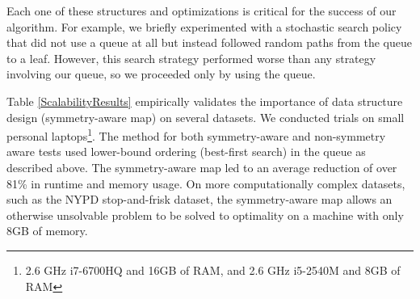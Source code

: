 \documentclass[format=sigconf]{acmart}
\begin{document}

Each one of these structures and optimizations is critical for the success of our algorithm.
For example, we briefly experimented with a stochastic search policy that did not use a queue at all but instead followed random paths from the queue to a leaf.
However, this search strategy performed worse than any strategy involving our queue, so we proceeded only by using the queue.

Table \ref{ScalabilityResults} empirically validates the importance of data structure design (symmetry-aware map) on several datasets.
We conducted trials on small personal laptops\footnote{2.6 GHz i7-6700HQ and 16GB of RAM, and 2.6 GHz i5-2540M and 8GB of RAM}.
The method for both symmetry-aware and non-symmetry aware tests used lower-bound ordering (best-first search) in the queue as described above.
The symmetry-aware map led to an average reduction of over 81\% in runtime and memory usage. 
On more computationally complex datasets, such as the NYPD stop-and-frisk dataset, the symmetry-aware map allows an otherwise unsolvable problem to be solved to optimality on a machine with only 8GB of memory.
\end{document}
